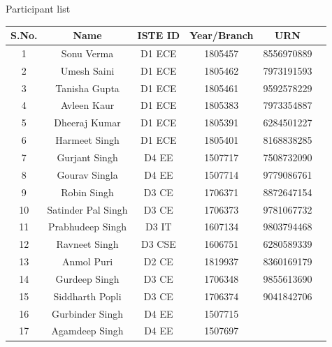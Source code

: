 \documentclass[12pt, a4 paper]{article}
\begin{document}
\begin{center}
\huge Participant list
\end{center}

\begin{table}[h!]
  \begin{center}
    \begin{tabular}{|c|c|c|c|c|c|} 
    \toprule %
      \textbf{S.No.} & \textbf{Name} & \textbf{ISTE ID} &\textbf{Year/Branch} & \textbf{URN}\\
      \midrule %
      1  & Sonu Verma	      & D1 ECE & 1805457 & 8556970889 \\
      2  & Umesh Saini	      & D1 ECE & 1805462 & 7973191593 \\
      3  & Tanisha Gupta      & D1 ECE & 1805461 & 9592578229 \\
      4  & Avleen Kaur	      & D1 ECE & 1805383 & 7973354887 \\
      5  & Dheeraj Kumar	  & D1 ECE & 1805391 & 6284501227 \\
      6  & Harmeet Singh	  & D1 ECE & 1805401 & 8168838285 \\
      7  & Gurjant Singh	  & D4 EE  & 1507717 & 7508732090 \\
      8  & Gourav Singla	  & D4 EE  & 1507714 & 9779086761 \\
      9  & Robin Singh	      & D3 CE  & 1706371 & 8872647154 \\
      10 & Satinder Pal Singh & D3 CE  & 1706373 & 9781067732	          \\
      11 & Prabhudeep Singh   & D3 IT  & 1607134 & 9803794468 \\
      12 & Ravneet Singh	  & D3 CSE & 1606751 & 6280589339 \\
      13 & Anmol Puri	      & D2 CE  & 1819937 & 8360169179 \\
      14 & Gurdeep Singh	  & D3 CE  & 1706348 & 9855613690 \\
      15 & Siddharth Popli	  & D3 CE  & 1706374 & 9041842706 \\
      16 & Gurbinder Singh	  & D4 EE  & 1507715 &\\
      17  & Agamdeep Singh	  & D4 EE  & 1507697 &\\


      \bottomrule %
    \end{tabular}
  \end{center}
\end{table}
\end{document}
